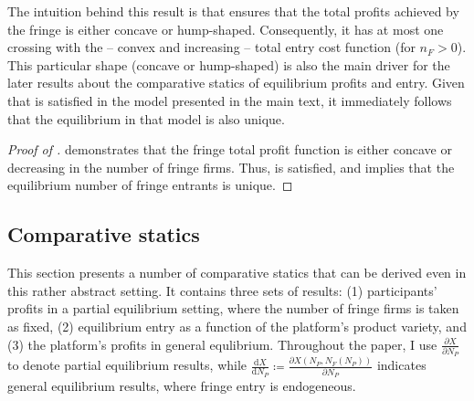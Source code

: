 \documentclass[a4paper]{article}
\newcommand{\dd}{\mathrm{d}}
\begin{document}
The intuition behind this result is that  ensures that the total profits achieved by the fringe is either concave or hump-shaped.
Consequently, it has at most one crossing with the -- convex and increasing -- total entry cost function (for $n_F > 0$).
This particular shape (concave or hump-shaped) is also the main driver for the later results about the comparative statics of equilibrium profits and entry.
Given that  is satisfied in the model presented in the main text, it immediately follows that the equilibrium in that model is also unique.
\begin{proof}[Proof of ]
     demonstrates that the fringe total profit function is either concave or decreasing in the number of fringe firms.
    Thus,  is satisfied, and  implies that the equilibrium number of fringe entrants is unique.
\end{proof}

\subsection{Comparative statics}
\label{sec:more_general_results}

This section presents a number of comparative statics that can be derived even in this rather abstract setting.
It contains three sets of results: (1) participants' profits in a partial equilibrium setting, where the number of fringe firms is taken as fixed, (2) equilibrium entry as a function of the platform's product variety, and (3) the platform's profits in general equlibrium.
Throughout the paper, I use $\frac{\partial X}{\partial N_P}$ to denote partial equilibrium results, while $\frac{\dd X}{\dd N_P} \coloneq \frac{\partial X(N_P, N_F(N_P))}{\partial N_P}$ indicates general equilibrium results, where fringe entry is endogeneous.
\end{document}

